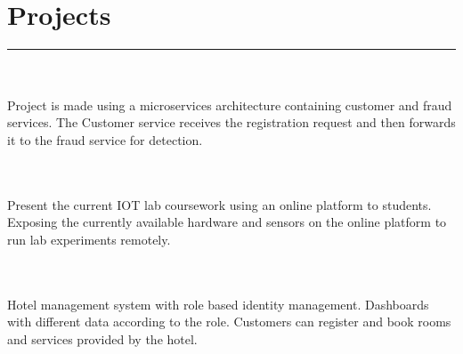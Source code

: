 \documentclass[]{rahulworld-resume}
\begin{document}
\hfill
\begin{minipage}[t]{0.57\textwidth} 
\hspace*{0pt}\hfill    \\
\hspace*{0pt}\hfill    \\
\hspace*{0pt}\hfill    \\
\hspace*{0pt}\hfill    \\

\section{Projects} %
\noindent\rule{11 cm}{0.1pt}


\datecolor{}   
\noindent
\hspace{5em}%
\begin{minipage}{1\textwidth\vspace{2pt}}
\\\\
Project is made using a microservices architecture containing customer and fraud services. The Customer service receives the registration request and then forwards it to the fraud service for detection.
\end{minipage}
\sectionsep

\datecolor{} 
\noindent
\hspace{5em}%
\begin{minipage}{1\textwidth\vspace{2pt}}
\\\\
Present the current IOT lab coursework using an online platform to students. Exposing the currently available hardware and sensors on the online platform to run lab experiments remotely.
\end{minipage}
\sectionsep

\datecolor{}  
\noindent
\hspace{5em}%
\begin{minipage}{1\textwidth\vspace{2pt}}
\\\\
Hotel management system with role based identity management. Dashboards with different data according to the role. Customers can register and book rooms and services provided by the hotel.
\end{minipage}
\sectionsep


\end{minipage}
\end{document}
